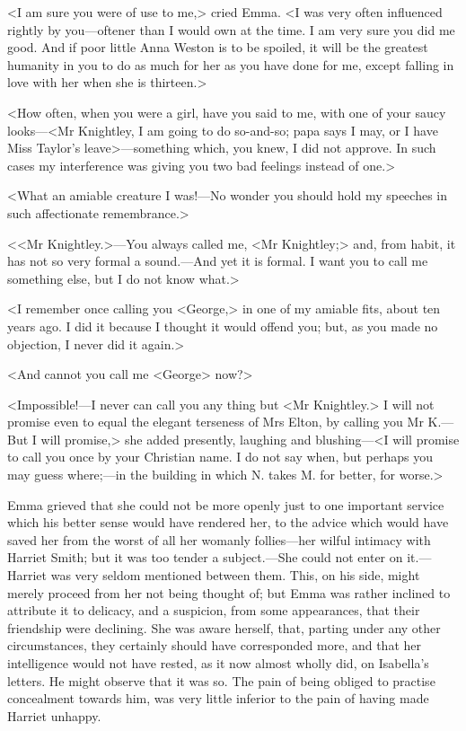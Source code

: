 <I am sure you were of use to me,> cried Emma. <I was very often influenced rightly by you—oftener than I would own at the time. I am very sure you did me good. And if poor little Anna Weston is to be spoiled, it will be the greatest humanity in you to do as much for her as you have done for me, except falling in love with her when she is thirteen.>

<How often, when you were a girl, have you said to me, with one of your saucy looks—<Mr Knightley, I am going to do so-and-so; papa says I may, or I have Miss Taylor's leave>—something which, you knew, I did not approve. In such cases my interference was giving you two bad feelings instead of one.>

<What an amiable creature I was!—No wonder you should hold my speeches in such affectionate remembrance.>

<<Mr Knightley.>—You always called me, <Mr Knightley;> and, from habit, it has not so very formal a sound.—And yet it is formal. I want you to call me something else, but I do not know what.>

<I remember once calling you <George,> in one of my amiable fits, about ten years ago. I did it because I thought it would offend you; but, as you made no objection, I never did it again.>

<And cannot you call me <George> now?>

<Impossible!—I never can call you any thing but <Mr Knightley.> I will not promise even to equal the elegant terseness of Mrs Elton, by calling you Mr K\@.—But I will promise,> she added presently, laughing and blushing—<I will promise to call you once by your Christian name. I do not say when, but perhaps you may guess where;—in the building in which N. takes M. for better, for worse.>

Emma grieved that she could not be more openly just to one important service which his better sense would have rendered her, to the advice which would have saved her from the worst of all her womanly follies—her wilful intimacy with Harriet Smith; but it was too tender a subject.—She could not enter on it.—Harriet was very seldom mentioned between them. This, on his side, might merely proceed from her not being thought of; but Emma was rather inclined to attribute it to delicacy, and a suspicion, from some appearances, that their friendship were declining. She was aware herself, that, parting under any other circumstances, they certainly should have corresponded more, and that her intelligence would not have rested, as it now almost wholly did, on Isabella's letters. He might observe that it was so. The pain of being obliged to practise concealment towards him, was very little inferior to the pain of having made Harriet unhappy.

